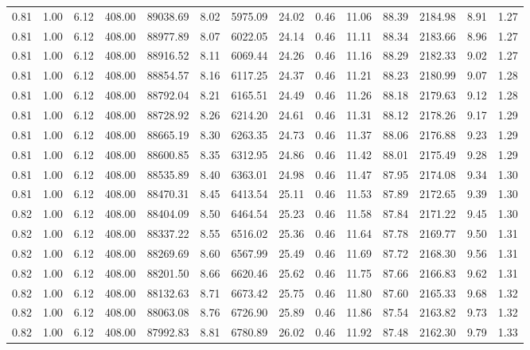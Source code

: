 \begin{table}[!ht]
\begin{tabular}{rrrrrrrrrrrrrr}
0.81 & 1.00 & 6.12 & 408.00 & 89038.69 & 8.02 & 5975.09 & 24.02 & 0.46 & 11.06 & 88.39 & 2184.98 & 8.91 & 1.27 \\
0.81 & 1.00 & 6.12 & 408.00 & 88977.89 & 8.07 & 6022.05 & 24.14 & 0.46 & 11.11 & 88.34 & 2183.66 & 8.96 & 1.27 \\
0.81 & 1.00 & 6.12 & 408.00 & 88916.52 & 8.11 & 6069.44 & 24.26 & 0.46 & 11.16 & 88.29 & 2182.33 & 9.02 & 1.27 \\
0.81 & 1.00 & 6.12 & 408.00 & 88854.57 & 8.16 & 6117.25 & 24.37 & 0.46 & 11.21 & 88.23 & 2180.99 & 9.07 & 1.28 \\
0.81 & 1.00 & 6.12 & 408.00 & 88792.04 & 8.21 & 6165.51 & 24.49 & 0.46 & 11.26 & 88.18 & 2179.63 & 9.12 & 1.28 \\
0.81 & 1.00 & 6.12 & 408.00 & 88728.92 & 8.26 & 6214.20 & 24.61 & 0.46 & 11.31 & 88.12 & 2178.26 & 9.17 & 1.29 \\
0.81 & 1.00 & 6.12 & 408.00 & 88665.19 & 8.30 & 6263.35 & 24.73 & 0.46 & 11.37 & 88.06 & 2176.88 & 9.23 & 1.29 \\
0.81 & 1.00 & 6.12 & 408.00 & 88600.85 & 8.35 & 6312.95 & 24.86 & 0.46 & 11.42 & 88.01 & 2175.49 & 9.28 & 1.29 \\
0.81 & 1.00 & 6.12 & 408.00 & 88535.89 & 8.40 & 6363.01 & 24.98 & 0.46 & 11.47 & 87.95 & 2174.08 & 9.34 & 1.30 \\
0.81 & 1.00 & 6.12 & 408.00 & 88470.31 & 8.45 & 6413.54 & 25.11 & 0.46 & 11.53 & 87.89 & 2172.65 & 9.39 & 1.30 \\
0.82 & 1.00 & 6.12 & 408.00 & 88404.09 & 8.50 & 6464.54 & 25.23 & 0.46 & 11.58 & 87.84 & 2171.22 & 9.45 & 1.30 \\
0.82 & 1.00 & 6.12 & 408.00 & 88337.22 & 8.55 & 6516.02 & 25.36 & 0.46 & 11.64 & 87.78 & 2169.77 & 9.50 & 1.31 \\
0.82 & 1.00 & 6.12 & 408.00 & 88269.69 & 8.60 & 6567.99 & 25.49 & 0.46 & 11.69 & 87.72 & 2168.30 & 9.56 & 1.31 \\
0.82 & 1.00 & 6.12 & 408.00 & 88201.50 & 8.66 & 6620.46 & 25.62 & 0.46 & 11.75 & 87.66 & 2166.83 & 9.62 & 1.31 \\
0.82 & 1.00 & 6.12 & 408.00 & 88132.63 & 8.71 & 6673.42 & 25.75 & 0.46 & 11.80 & 87.60 & 2165.33 & 9.68 & 1.32 \\
0.82 & 1.00 & 6.12 & 408.00 & 88063.08 & 8.76 & 6726.90 & 25.89 & 0.46 & 11.86 & 87.54 & 2163.82 & 9.73 & 1.32 \\
0.82 & 1.00 & 6.12 & 408.00 & 87992.83 & 8.81 & 6780.89 & 26.02 & 0.46 & 11.92 & 87.48 & 2162.30 & 9.79 & 1.33 \\

\end{tabular}
\end{table}
